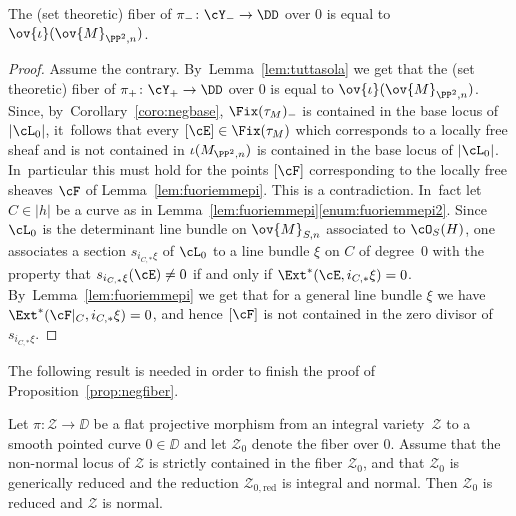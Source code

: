 \begin{prop}\label{prop:tuttasola}
The (set theoretic) fiber of $\pi_{-}\colon\cY_{-}\to\DD$ over $0$ is equal to $\ov{\iota}(\ov{M}_{\PP^2,n})$.
\end{prop}

\begin{proof}
Assume the contrary. By~Lemma~\ref{lem:tuttasola} we get that the (set theoretic) fiber of $\pi_{+}\colon\cY_{+}\to\DD$ over $0$ is equal to
$\ov{\iota}(\ov{M}_{\PP^2,n})$. Since, by~Corollary~\ref{coro:negbase}, $\Fix(\tau_M)_{-}$ is contained in the base locus of $|\cL_0|$, it~follows that every $[\cE]\in \Fix(\tau_M)$ which corresponds to a locally free sheaf and is not contained
in $\iota(M_{\PP^2,n})$ is contained in the base locus of $|\cL_0|$. In~particular this must hold for the points $[\cF]$ corresponding to the locally free sheaves $\cF$ of Lemma~\ref{lem:fuoriemmepi}. This is a contradiction. In~fact let $C\in|h|$ be a curve as in Lemma~\ref{lem:fuoriemmepi}\eqref{enum:fuoriemmepi2}.
Since $\cL_0$ is the determinant line bundle on $\ov{M}_{S,n}$ associated to $\cO_S(H)$, one associates a section $s_{i_{C,*}\xi}$ of $\cL_0$ to a line bundle $\xi$ on $C$ of degree~0 with the property
that $s_{i_{C,*}\xi}(\cE)\neq 0$ if and only if $\Ext^*(\cE,i_{C,*}\xi)=0$. By~Lemma~\ref{lem:fuoriemmepi} we get that for a general line bundle $\xi$
we have $\Ext^*(\cF\vert_{C},i_{C,*}\xi)=0$, and hence $[\cF]$ is not contained in the zero divisor of
$s_{i_{C,*}\xi}$.
\end{proof}

The following result is needed in order to finish the proof of Proposition~\ref{prop:negfiber}.

\begin{lemm}\label{lem:NormalityImpliesReduced}
Let $\pi\colon \mathcal{Z} \to \DD$ be a flat projective morphism from an integral variety~$\mathcal{Z}$ to a smooth pointed curve $0 \in \DD$ and let $\mathcal{Z}_0$ denote the fiber over $0$.
Assume that the non-normal locus of $\mathcal{Z}$ is strictly contained in the fiber $\mathcal{Z}_0$, and that $\mathcal{Z}_0$ is generically reduced and the reduction $\mathcal{Z}_{0,\mathrm{red}}$ is integral and normal.
Then $\mathcal{Z}_0$ is reduced and $\mathcal{Z}$ is normal.
\end{lemm}

